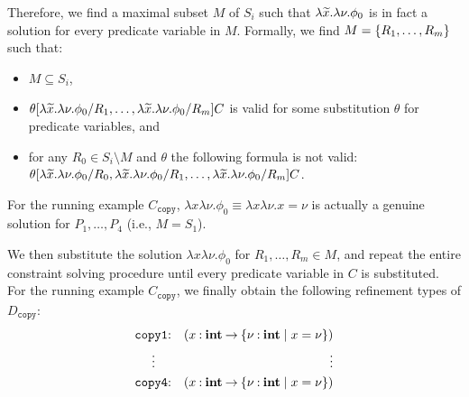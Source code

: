Therefore, we find a maximal subset \(M\) of \(S_i\) such that
\(\lambda\widetilde{x}.\lambda \nu.\phi_0\) is in fact a solution for every
predicate variable in \(M\).  Formally, we find \(M=\{{R_1,\dots,R_m}\}\)
such that:
\begin{itemize}
\item \(M \subseteq S_i\),
\item \(\theta[\lambda\widetilde{x}.\lambda
\nu.\phi_0/R_1,\dots,\lambda\widetilde{x}.\lambda \nu.\phi_0/R_m]C\) is valid
for some substitution \(\theta\) for predicate variables, and
\item for any \(R_0 \in S_i \setminus M\) and \(\theta\) the following
formula is not valid: \(\theta[\lambda\widetilde{x}.\lambda
\nu.\phi_0/R_0,\lambda\widetilde{x}.\lambda
\nu.\phi_0/R_1,\dots,\lambda\widetilde{x}.\lambda \nu.\phi_0/R_m]C\).
\end{itemize}
For the running example \(C_{\texttt{copy}}\), \(\lambda x \lambda
\nu.\phi_0 \equiv \lambda x \lambda \nu.x=\nu\) is actually a genuine
solution for \(P_1,\dots,P_4\) (i.e., \(M=S_1\)).

We then substitute the solution \(\lambda x \lambda \nu.\phi_0\) for
\(R_1,\dots,R_m \in M\), and repeat the entire constraint solving
procedure until every predicate variable in \(C\) is substituted.  For
the running example \(C_{\texttt{copy}}\), we finally obtain the
following refinement types of \(D_{\texttt{copy}}\):
\begin{eqnarray*}
\texttt{copy1}&\mathbin{:}&(x\mathbin{:}{\mathbf{int}}\mathbin{\rightarrow}{\{{\nu\mathbin{:}\mathbf{int} \mid x=\nu}\}}) \\
\vdots\quad &&\qquad\qquad \vdots \\
\texttt{copy4}&\mathbin{:}&(x\mathbin{:}{\mathbf{int}}\mathbin{\rightarrow}{\{{\nu\mathbin{:}\mathbf{int} \mid x=\nu}\}})
\end{eqnarray*}


%

